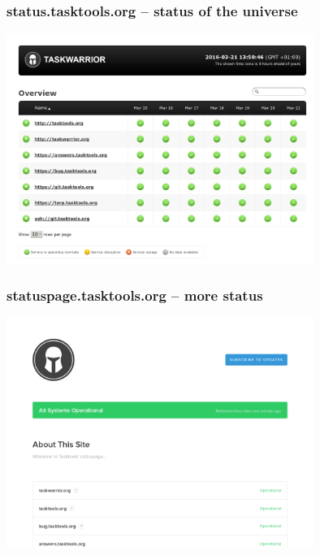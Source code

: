 \documentclass[t,handout]{beamer}
\begin{document}
\begin{frame}\frametitle{status.tasktools.org -- status of the universe}
    \begin{center}
        \href{http://status.tasktools.org/}{\includegraphics[width=10cm,height=7.5cm]{status-tasktools-org.png}}
    \end{center}
\end{frame}

\begin{frame}\frametitle{statuspage.tasktools.org -- more status}
    \begin{center}
        \href{http://statuspage.tasktools.org/}{\includegraphics[width=10cm,height=7.5cm]{statuspage-tasktools-org.png}}
    \end{center}
\end{frame}
\end{document}
